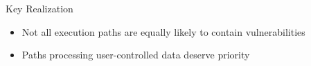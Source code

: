 \documentclass[aspectratio=169]{beamer}
\begin{document}
\begin{frame}
\begin{columns}
\begin{column}{0.5\textwidth}
\begin{center}
            \end{center}
        \end{column}
    \end{columns}
    
    \begin{implementation}{Key Realization}
        \begin{itemize}
            \item Not all execution paths are equally likely to contain vulnerabilities
            \item Paths processing user-controlled data deserve priority
        \end{itemize}
    \end{implementation}
\end{frame}
\end{document}
